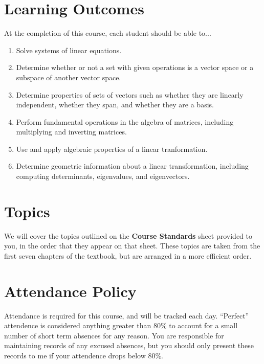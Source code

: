 \documentclass[letterpaper]{article}
\begin{document}
\section*{\fontsize{12}{15}\selectfont Learning Outcomes}
At the completion of this course, each student should be able to...
\begin{enumerate}[1)]
\item Solve systems of linear equations.
\item Determine whether or not a set with given operations is a vector space or a subspace of another vector space.
\item Determine properties of sets of vectors such as whether they are linearly independent, whether they span, and whether they are a basis.
\item Perform fundamental operations in the algebra of matrices, including multiplying and inverting matrices.
\item Use and apply algebraic properties of a linear tranformation.
\item Determine geometric information about a linear transformation, including computing determinants, eigenvalues, and eigenvectors.
\end{enumerate}

\section*{\fontsize{12}{15}\selectfont Topics}
We will cover the topics outlined on the \textbf{Course Standards}
sheet provided to you, in the order that they appear on that sheet.
These topics are taken from the first seven chapters of the textbook,
but are arranged in a more efficient order.


\section*{\fontsize{12}{15}\selectfont Attendance Policy}
Attendance is required for this course, and will be tracked each day.
``Perfect'' attendence is considered anything greater than 80\%
to account for a small number of short term absences for any reason.
You are responsible for maintaining records of any excused absences,
but you should only present these records to me if your attendence drops
below 80\%.
\end{document}
